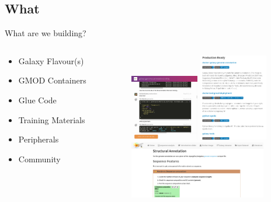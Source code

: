 \documentclass[12pt]{phage3slides} %
\begin{document}
\subsection{What}
\begin{frame}{What are we building?}
    \begin{columns}
        \begin{column}{0.38\textwidth}
            \begin{itemize}
                \item Galaxy Flavour(s)
                \item GMOD Containers
                \item Glue Code
                \item Training Materials
                \item Peripherals
                \item Community
            \end{itemize}
        \end{column}
        \begin{column}{0.58\textwidth}
            \includegraphics[width=3cm]{img/gga-chat.png}
            \includegraphics[width=3cm]{img/gga-gh.png} \\[.7cm]
            \includegraphics[width=6cm]{img/gga-docs.png}
        \end{column}
    \end{columns}
\end{frame}
\end{document}
